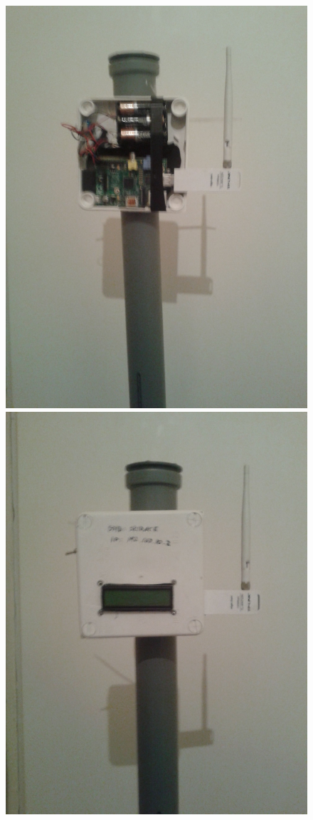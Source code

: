 \documentclass[11pt,a4paper, twoside]{article}
\begin{document}
\begin{figure}[H]
\begin{center}
\includegraphics[scale=0.06]{./img/start-in.jpg}
\includegraphics[scale=0.06]{./img/finish.jpg}

\end{center}
\end{figure}
\end{document}
